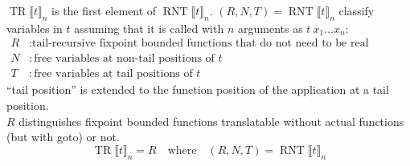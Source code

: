 \documentclass[a4paper,fleqn]{article}
\newcommand{\BRA}[1]{\llbracket #1 \rrbracket}
\DeclareMathOperator{\TRop}{TR}
\newcommand{\TR}[2]{\TRop\BRA{#1}_{#2}}
\DeclareMathOperator{\RNTop}{RNT}
\newcommand{\RNT}[2]{\RNTop\BRA{#1}_{#2}}
\newcommand{\kwgoto}{\mbox{\color{myviolet}\ttfamily goto}}
\begin{document}
$\TR{t}{n}$ is the first element of $\RNT{t}{n}$.
$(R,N,T) = \RNT{t}{n}$ classify variables in $t$ assuming that it is called with $n$ arguments as $t\:x_1\ldots x_n$:
\begin{align*}
  R &: \text{tail-recursive fixpoint bounded functions that do not need to be real functions} \\
  N &: \text{free variables at non-tail positions of $t$} \\
  T &: \text{free variables at tail positions of $t$}
\end{align*}
``tail position'' is extended to the function position of the application at a tail position. \\
$R$ distinguishes fixpoint bounded functions translatable without actual functions (but with \kwgoto{}) or not.
\[ \TR{t}{n} = R \quad \text{where}\quad (R,N,T) = \RNT{t}{n} \]
\end{document}
